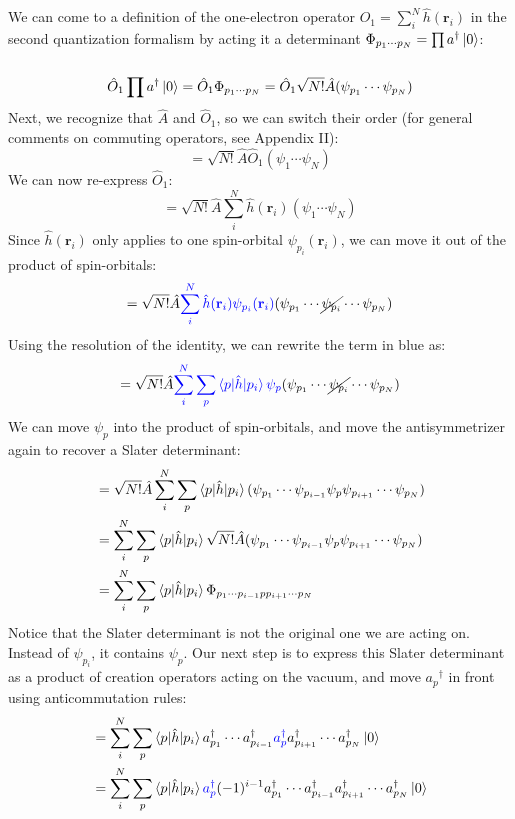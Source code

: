 \documentclass{article}
\newcommand{\dg}{\ensuremath{^\dagger} }
\def\*#1{\mathbf{#1}}
\begin{document}
We can come to a definition of the one-electron operator $\hat{O}_1 = \sum\limits_i^N \hat{h} (\*{r}_i) $  in the second quantization formalism by acting it a determinant $ \Phi_{p_1 \cdots p_N} = \prod a\dg \ket{0} $:  \\ \\
\[\hat{O}_1 \prod a\dg \ket{0} = \hat{O}_1\Phi_{p_1 \cdots p_N} = \hat{O}_1 \sqrt{N!} \hat{A} (\psi_{p_1} \cdots \psi_{p_N}) \]
Next, we recognize that  $\hat{A}$ and $\hat{O}_1$, so we can switch their order (for general comments on commuting operators, see Appendix II): 
\[ = \sqrt{N!}  \hat{A} \hat{O}_1  (\psi_1 \cdots \psi_N) \]
We can now re-express $\hat{O}_1$: 
\[=  \sqrt{N!}  \hat{A}  \sum_i^N \hat{h} (\*{r}_i) (\psi_1 \cdots \psi_N) \]
Since $\hat{h} (\*{r}_i) $ only applies to one spin-orbital $\psi_{p_i}(\*{r}_i)$, we can move it out of the product of spin-orbitals:
\[=  \sqrt{N!}  \hat{A} {\color{blue}  \sum_i^N \hat{h} (\*{r}_i) \psi_{p_i} (\*{r}_i)} (\psi_{p_1} \cdots \cancel{\psi_{p_i}} \cdots \psi_{p_N}) \]
Using the resolution of the identity, we can rewrite the term in {\color{blue}blue} as: 
\[=  \sqrt{N!}   \hat{A}  {\color{blue} \sum_i^N  \sum_p \braket{p | \hat{h} | p_i } \psi_p } (\psi_{p_1} \cdots \cancel{\psi_{p_i}} \cdots \psi_{p_N}) \]
 We can move $\psi_p$ into the product of spin-orbitals, and move the antisymmetrizer again to recover a Slater determinant: 
\begin{align*}
&= \sqrt{N!}  \hat{A}   \sum_i^N  \sum_p \braket{p | \hat{h} | p_i }  (\psi_{p_1} \cdots \psi_{p_{i-1}} \psi_p \psi_{p_{i+1}} \cdots \psi_{p_N}) \\
&=\sum_i^N  \sum_p \braket{p | \hat{h} | p_i } \sqrt{N!}  \hat{A} (\psi_{p_1} \cdots \psi_{p_{i-1}} \psi_p \psi_{p_{i+1}} \cdots \psi_{p_N}) \\
&=\sum_i^N  \sum_p \braket{p | \hat{h} | p_i } \Phi_{{p_1} \cdots {p_{i-1}} p {p_{i+1}} \cdots {p_N}} \\
\end{align*}
Notice that the Slater determinant is not the original one we are acting on. Instead of $\psi_{p_i}$, it contains $\psi_p$.  
Our next step is to express this Slater determinant as a product of creation operators acting on the vacuum, and move $a_p\dg$ in front using anticommutation rules:
\begin{align*}
&= \sum_i^N  \sum_p \braket{p | \hat{h} | p_i } a_{p_1}^\dagger \cdots a_{p_{i-1}}^\dagger {\color{blue}a_p^\dagger} a_{p_{i+1}}^\dagger \cdots a_{p_N}^\dagger \ket{0}\\
&= \sum_i^N  \sum_p \braket{p | \hat{h} | p_i } {\color{blue}a_p^\dagger} (-1)^{i-1} a_{p_1}^\dagger \cdots a_{p_{i-1}}^\dagger a_{p_{i+1}}^\dagger \cdots a_{p_N}^\dagger \ket{0}\\
\end{align*}
\end{document}
